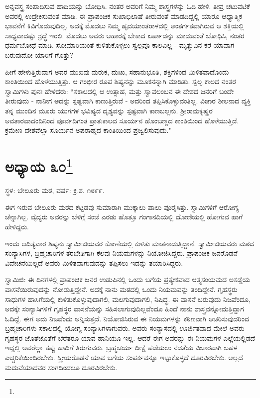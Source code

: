 ಅನ್ನವಸ್ತ್ರ ಸಂಪಾದಿಸುವ ಹಾದಿಯನ್ನು ಬೋಧಿಸಿ. ನಂತರ ಅವರಿಗೆ ನಿಮ್ಮ ಶಾಸ್ತ್ರಗಳನ್ನು ಓದಿ ಹೇಳಿ. ತೀವ್ರ ಚಟುವಟಿಕೆ ಅವರಲ್ಲಿ ಉದ್ರೇಕಿಸುವಂತೆ ಮಾಡಿ. ಈ ಪ್ರಾಪಂಚಿಕ ಸುಖಾಭಿಲಾಷೆ ತೀರುವಂತೆ ಮಾಡದಿದ್ದಲ್ಲಿ ಯಾರೂ ಆಧ್ಯಾತ್ಮಿಕ ಭಾವನೆಗೆ ಕಿವಿಗೊಡುವುದಿಲ್ಲ. ಅದಕ್ಕೆ ಮೊದಲು ನಿಮ್ಮ ಹೃದಯಾಂತರಾಳದಲ್ಲಿ ಅಂತರ್ಗತವಾಗಿರುವ ಆ ಶಕ್ತಿಯಲ್ಲಿ ಸಾಧ್ಯವಾದಷ್ಟು ಶ್ರದ್ಧೆ ಇರಲಿ. ಮೊದಲು ಅವರು ಆಹಾರಕ್ಕೆ ಬೇಕಾದ ಏರ್ಪಾಡನ್ನು ಮಾಡುವಂತೆ ಬೋಧಿಸಿ, ನಂತರ ಧರ್ಮಬೋಧೆ ಮಾಡಿ. ಸೋಮಾರಿಯಂತೆ ಕುಳಿತುಕೊಳ್ಳಲು ಸ್ವಲ್ಪವೂ ಕಾಲವಿಲ್ಲ - ಮೃತ್ಯುವಿನ ಕರೆ ಯಾವಾಗ ಬರುವುದೋ ಯಾರಿಗೆ ಗೊತ್ತು?

ಹೀಗೆ ಹೇಳುತ್ತಿರುವಾಗ ಅವರ ಮುಖವು ಮರುಕ, ದುಃಖ, ಸಹಾನುಭೂತಿ, ಶಕ್ತಿಗಳಿಂದ ಮಿಳಿತವಾದೊಂದು ಕಾಂತಿಯಿಂದ ಹೊಳೆಯುತ್ತಿತ್ತು. ಆ ಗಂಭೀರ ರೂಪ ಶಿಷ್ಯನನ್ನು ಮೂಕನನ್ನಾಗಿ ಮಾಡಿತು. ಸ್ವಲ್ಪ ಕಾಲದ ನಂತರ ಸ್ವಾಮಿಗಳು ಪುನಃ ಹೇಳಿದರು: “ಸಕಾಲದಲ್ಲಿ ಆ ಉತ್ಸಾಹ, ಮತ್ತು ಸ್ವಾವಲಂಬನ ಈ ದೇಶದ ಜನರಿಗೆ ಬಂದೇ ತೀರುವುದು - ನಾನೀಗ ಅದನ್ನು ಸ್ಪಷ್ಟವಾಗಿ ಕಾಣುತ್ತಿರುವೆ - ಅದರಿಂದ ತಪ್ಪಿಸಿಕೊಳ್ಳುವಂತಿಲ್ಲ. ವಿಚಾರ ಶೀಲನಾದ ವ್ಯಕ್ತಿ ತನ್ನ ಮುಂದಿನ ಮೂರು ಯುಗಗಳ ಭವಿಷ್ಯದ ದೃಶ್ಯವನ್ನು ಸ್ಪಷ್ಟವಾಗಿ ಕಾಣಬಲ್ಲನು. ಶ‍್ರೀರಾಮಕೃಷ್ಣರ ಅವತಾರವಾದಂದಿನಿಂದ ಪೂರ್ವದಿಗಂತ ಪ್ರಾತಃಕಾಲದ ಸೂರ್ಯನ ಹೊಂಬಣ್ಣದ ಕಾಂತಿಯಿಂದ ಹೊಳೆಯುತ್ತಿದೆ. ಕ್ರಮೇಣ ದೇಶವೆಲ್ಲಾ ಸೂರ್ಯನ ಅಪರಾಹ್ನದ ಕಾಂತಿಯಿಂದ ಪ್ರಜ್ವಲಿಸುವುದು."

\newpage

\chapter[ಅಧ್ಯಾಯ ೩೦]{ಅಧ್ಯಾಯ ೩೦\protect\footnote{}}

\begin{center}
ಸ್ಥಳ: ಬೇಲೂರು ಮಠ, ವರ್ಷ: ಕ್ರಿ.ಶ. ೧೮೯೯.
\end{center}

ಈಗ ಇರುವ ಬೇಲೂರು ಮಠದ ಕಟ್ಟಡವು ಸುಮಾರಾಗಿ ಮುಕ್ಕಾಲು ಪಾಲು ಪೂರೈಸಿತ್ತು. ಸ್ವಾಮಿಗಳಿಗೆ ಆರೋಗ್ಯ ಚೆನ್ನಾಗಿಲ್ಲ. ವೈದ್ಯರು ಅವರನ್ನು ಬೆಳಿಗ್ಗೆ ಸಂಜೆ ಎರಡು ಹೊತ್ತೂ ಗಂಗಾನದಿಯಲ್ಲಿ ದೋಣಿಯಲ್ಲಿ ಹೋಗುವ ಹಾಗೆ ಹೇಳಿದ್ದರು.

ಇಂದು ಆದಿತ್ಯವಾರ ಶಿಷ್ಯನು ಸ್ವಾಮೀಜಿಯವರ ಕೋಣೆಯಲ್ಲಿ ಕುಳಿತು ಮಾತನಾಡುತ್ತಿದ್ದಾನೆ. ಸ್ವಾಮೀಜಿಯವರು ಮಠದ ಸಂನ್ಯಾಸಿಗಳ, ಬ್ರಹ್ಮಚಾರಿಗಳ ತರಬೇತಿಗಾಗಿ ಕೆಲವು ನಿಯಮಗಳನ್ನು ನಿಯೋಜಿಸಿದ್ದರು. ಪ್ರಾಪಂಚಿಕ ಜನರೊಡನೆ ವಿವೇಚನೆಯಿಲ್ಲದೆ ಅವರು ಮಿಳಿತವಾಗುವುದನ್ನು ತಪ್ಪಿಸಲು ಇದನ್ನು ತಯಾರಿಸಿದ್ದರು.

ಸ್ವಾಮಿಜಿ: ಈ ದಿನಗಳಲ್ಲಿ ಪ್ರಾಪಂಚಿಕ ಜನರ ಉಡುಪಿನಲ್ಲಿ ಒಂದು ಬಗೆಯ ಪ್ರತ್ಯೇಕವಾದ ಆತ್ಮಸಂಯಮದ ಅಸಡ್ಡೆಯ ವಾಸನೆಯಿರುವುದನ್ನು ನೋಡುತ್ತಿದ್ದೇನೆ. ಅದಕ್ಕೆ ನಾನು ಮಠದಲ್ಲಿ ಒಂದು ನಿಯಮವನ್ನು ತಂದಿದ್ದೇನೆ. ಗೃಹಸ್ಥರು ಸಾಧುಗಳ ಹಾಸಿಗೆಯಲ್ಲಿ ಕುಳಿತುಕೊಳ್ಳುವುದಾಗಲಿ, ಮಲಗುವುದಾಗಲಿ, ನಿಷಿದ್ಧ. ಈ ವಾಸನೆ ಬರುವುದು ನಿಜವೆಂದೂ, ಅದಕ್ಕೇ ಸಂನ್ಯಾಸಿಗಳಿಗೆ ಗೃಹಸ್ಥರ ವಾಸನೆಯನ್ನು ಸಹಿಸಲಾಗುವುದಿಲ್ಲವೆಂದೂ ಹಿಂದೆ ನಾನು ಶಾಸ್ತ್ರವನ್ನೋದುತ್ತಿದ್ದಾಗ ಓದಿದ್ದೆ. ಈಗ ಅದು ನಿಜವೆಂದು ಅನ್ನಿಸುತ್ತದೆ. ನಿಯೋಜಿಸಿರುವ ಈ ನಿಯಮಗಳನ್ನು ಕಠಿಣವಾಗಿ ಆಚರಿಸುವುದರಿಂದ ಬ್ರಹ್ಮಚಾರಿಗಳು ಸಕಾಲದಲ್ಲಿ ಯೋಗ್ಯ ಸಂನ್ಯಾಸಿಗಳಾಗುವರು. ಅವರು ಸಂನ್ಯಾಸದಲ್ಲಿ ಊರ್ಜಿತವಾದ ಮೇಲೆ ಅವರು ಗೃಹಸ್ಥರ ಜೊತೆಜೊತೆಗೆ ಬೆರೆತರೂ ಯಾವ ಹಾನಿಯೂ ಇಲ್ಲ. ಆದರೆ ಈಗ ಅವರನ್ನು ಈ ನಿಯಮಗಳ ಎಲ್ಲೆಯಲ್ಲಿಡದೆ ಇದ್ದಲ್ಲಿ ಅವರೆಲ್ಲಾ ತಪ್ಪು ಹಾದಿಗೆ ತಿರುಗುವರು. ಬ್ರಹ್ಮಚರ್ಯ ದೀಕ್ಷೆ ಪಡೆಯಲು ನಡತೆಯ ವಿಚಾರವಾಗಿ ಬಹಳ ಎಚ್ಚರಿಕೆಯಿಂದಿರಬೇಕು. ಸ್ತ್ರೀಯರೊಡನೆ ಯಾವ ಬಗೆಯ ಸಂಪರ್ಕವನ್ನೂ ಇಟ್ಟುಕೊಳ್ಳದೆ ದೂರವಿರಬೇಕು. ಅಲ್ಲದೆ ಮದುವೆಯಾದವರ ಸಂಗದಿಂದಲೂ ದೂರವಿರಬೇಕು.

